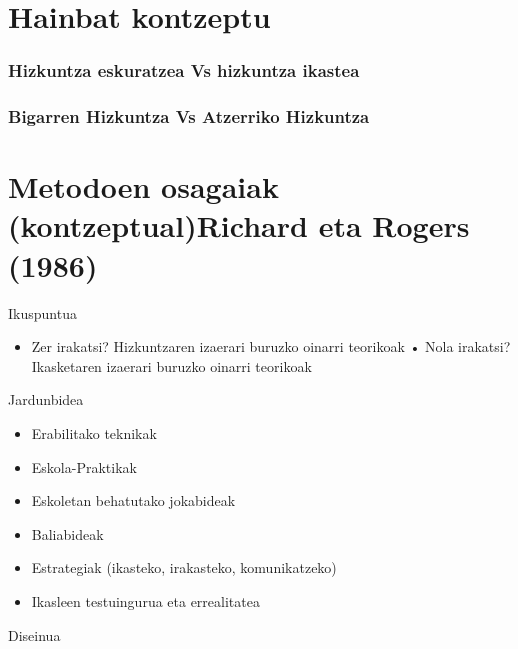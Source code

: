 \documentclass[
]{book}
\providecommand{\tightlist}{%
  \setlength{\itemsep}{0pt}\setlength{\parskip}{0pt}}
\begin{document}
\hypertarget{hainbat-kontzeptu}{%
\section{Hainbat kontzeptu}\label{hainbat-kontzeptu}}

\hypertarget{hizkuntza-eskuratzea-vs-hizkuntza-ikastea}{%
\subsubsection{Hizkuntza eskuratzea Vs hizkuntza ikastea}\label{hizkuntza-eskuratzea-vs-hizkuntza-ikastea}}

\hypertarget{bigarren-hizkuntza-vs-atzerriko-hizkuntza}{%
\subsubsection{Bigarren Hizkuntza Vs Atzerriko Hizkuntza}\label{bigarren-hizkuntza-vs-atzerriko-hizkuntza}}

\hypertarget{metodoen-osagaiak-kontzeptual-richard-eta-rogers-1986}{%
\section{\texorpdfstring{Metodoen osagaiak (kontzeptual)Richard eta Rogers (1986)}{Metodoen osagaiak (kontzeptual) Richard eta Rogers (1986)}}\label{metodoen-osagaiak-kontzeptual-richard-eta-rogers-1986}}

Ikuspuntua

\begin{itemize}
\tightlist
\item
  Zer irakatsi? Hizkuntzaren izaerari buruzko oinarri teorikoak
  • Nola irakatsi? Ikasketaren izaerari buruzko oinarri teorikoak
\end{itemize}

Jardunbidea

\begin{itemize}
\tightlist
\item
  Erabilitako teknikak
\item
  Eskola-Praktikak
\item
  Eskoletan behatutako jokabideak
\item
  Baliabideak
\item
  Estrategiak (ikasteko, irakasteko, komunikatzeko)
\item
  Ikasleen testuingurua eta errealitatea
\end{itemize}

Diseinua
\end{document}
